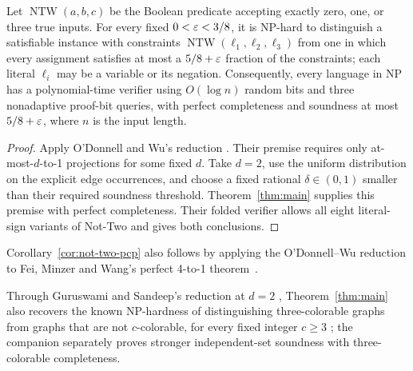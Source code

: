\begin{corollary}\label{cor:not-two-pcp}
Let $\operatorname{NTW}(a,b,c)$ be the Boolean predicate accepting exactly
zero, one, or three true inputs. For every fixed $0<\varepsilon<3/8$, it is NP-hard
to distinguish a satisfiable instance with constraints
$\operatorname{NTW}(\ell_1,\ell_2,\ell_3)$ from one in which every assignment
satisfies at most a $5/8+\varepsilon$ fraction of the constraints; each literal
$\ell_i$ may be a variable or its negation.
Consequently, every language in NP has a polynomial-time verifier using
$O(\log n)$ random bits and three nonadaptive proof-bit queries, with perfect
completeness and soundness at most $5/8+\varepsilon$, where $n$ is the input length.
\end{corollary}
\begin{proof}
Apply O'Donnell and Wu's reduction
\cite[Theorem~2.1 and Corollary~2.2, author manuscript]{ODonnellWu2008}.
Their premise requires only at-most-$d$-to-1 projections for some fixed $d$.
Take $d=2$, use the uniform distribution on the explicit edge occurrences,
and choose a fixed rational $\delta\in(0,1)$ smaller than their required
soundness threshold. Theorem~\ref{thm:main} supplies this premise with
perfect completeness. Their folded verifier allows all eight literal-sign
variants of Not-Two and gives both conclusions.
\end{proof}

Corollary~\ref{cor:not-two-pcp} also follows by applying the
O'Donnell--Wu reduction to Fei, Minzer and Wang's perfect 4-to-1
theorem~\cite{FeiMinzerWang2026}.

Through Guruswami and Sandeep's reduction at $d=2$
\cite[Theorem~1]{GuruswamiSandeep2020}, Theorem~\ref{thm:main} also
recovers the known NP-hardness of distinguishing three-colorable graphs
from graphs that are not $c$-colorable, for every fixed integer $c\ge3$
\cite[Corollary~1.7]{FeiMinzerWang2026}; the companion
\cite[Theorem~1.1]{OpenAIIndependentSets2026} separately proves stronger
independent-set soundness with three-colorable completeness.
